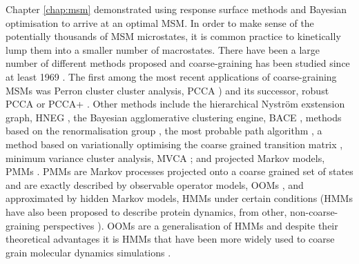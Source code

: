 Chapter \ref{chap:msm} demonstrated using response surface methods and Bayesian optimisation to arrive at an optimal MSM. In order to make sense of the potentially thousands of MSM microstates, it is common practice to kinetically lump them into a smaller number of macrostates. There have been a large number of different methods proposed and coarse-graining has been studied since at least 1969 \cite{kuoLumpingAnalysisMonomolecular, weiLumpingAnalysisMonomolecular1969}. The first among the most recent applications of coarse-graining MSMs was Perron cluster cluster analysis, PCCA \cite{deuflhardIdentificationAlmostInvariant2000a}) and its successor, robust PCCA or PCCA+ \cite{deuflhardRobustPerronCluster2005b}. Other methods include the hierarchical Nystr{\"o}m exstension graph, HNEG \cite{yaoHierarchicalNystromMethods2013a}, the Bayesian agglomerative clustering engine, BACE \cite{bowmanImprovedCoarsegrainingMarkov2012a}, methods based on the renormalisation group \cite{orioliDimensionalReductionMarkov2016c, hummerOptimalDimensionalityReduction2015a}, the most probable path algorithm \cite{jainIdentifyingMetastableStates2012a}, a method based on variationally optimising the coarse grained transition matrix \cite{martiniVariationalIdentificationMarkovian2017a}, minimum variance cluster analysis, MVCA \cite{husicMinimumVarianceClustering2018}; and projected Markov models, PMMs \cite{noeProjectedHiddenMarkov2013a}. PMMs are Markov processes projected onto a coarse grained set of states and are exactly described by observable operator models, OOMs \cite{wuProjectedMetastableMarkov2015}, and approximated by hidden Markov models, HMMs \cite{noeProjectedHiddenMarkov2013a} under certain conditions (HMMs have also been proposed to describe protein dynamics, from other, non-coarse-graining perspectives \cite{mcgibbonUnderstandingProteinDynamics}). OOMs are a generalisation of HMMs \cite{jaegerDiscretetimeDiscretevaluedObservable} and despite their theoretical advantages it is HMMs that have been more widely used to coarse grain molecular dynamics simulations \cite{mondalAtomicResolutionMechanism2018a, plattnerCompleteProteinProtein2017, panConformationalHeterogeneityMichaelis2016, juarez-jimenezDynamicDesignManipulation2020, wangDynamicalBehaviorVLactamases2019,FastFoldingPathwaysThrombinBinding2018,remingtonFluorescenceQuenching2aminopurinelabeled2019,curado-carballadaHiddenConformationsAspergillus2019,furiniIontriggeredSelectivityBacterial2018,yangMappingPathwayDynamics2018,ahalawatMappingSubstrateRecognition2018,olaposiMembraneBoundTranscriptionFactor2019, xiaoNaBindingModes2019, hansonWhatMakesKinase2019}. 

